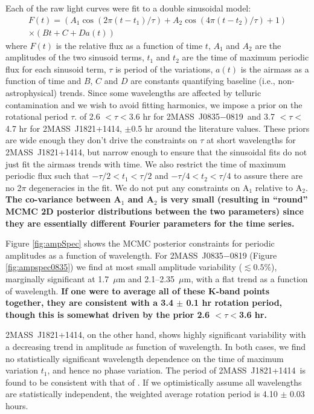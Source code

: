 \documentclass[twocolumn]{aastex6}
\newcommand{\sha}{2MASS~J0835$-$0819}
\newcommand{\shb}{2MASS~J1821+1414}
\begin{document}
Each of the raw light curves were fit to a double sinusoidal model:
\begin{equation}\label{eq:cosfit}
\begin{split}
F(t) = \left( A_1 \cos(2 \pi (t - t_1)/\tau) + A_2 \cos(4 \pi (t - t_2)/\tau) + 1\right) \\
\times (B t + C + D a(t))
\end{split}
\end{equation}
where $F(t)$ is the relative flux as a function of time $t$, $A_1$ and $A_2$ are the amplitudes of the two sinusoid terms, $t_1$ and $t_2$ are the time of maximum periodic flux for each sinusoid term, $\tau$ is period of the variations, $a(t)$ is the airmass as a function of time and $B$, $C$ and $D$ are constants quantifying baseline (i.e., non-astrophysical) trends.
Since some wavelengths are affected by telluric contamination and we wish to avoid fitting harmonics, we impose a prior on the rotational period $\tau$.
of 2.6 $< \tau < $3.6 hr for \sha\ and 3.7 $< \tau <$ 4.7 hr for {\shb}, $\pm$0.5 hr around the literature values.
These priors are wide enough they don't drive the constraints on $\tau$ at short wavelengths for {\shb}, but narrow enough to ensure that the sinusoidal fits do not just fit the airmass trends with time.
We also restrict the time of maximum periodic flux such that $-\tau/2 < t_1 < \tau/2$ and $-\tau/4 < t_2 < \tau/4$ to assure there are no 2$\pi$ degeneracies in the fit.
We do not put any constraints on A$_1$ relative to A$_2$.
\textbf{The co-variance between A$_1$ and A$_2$ is very small (resulting in ``round'' MCMC 2D posterior distributions between the two parameters) since they are essentially different Fourier parameters for the time series.}

Figure \ref{fig:ampSpec} shows the MCMC posterior constraints for periodic amplitudes as a function of wavelength.
For {\sha} (Figure \ref{fig:ampspec0835}) we find at most small amplitude variability ($\lesssim 0.5\%$), marginally significant at 1.7~$\mu$m and 2.1--2.35~$\mu$m, with a flat trend as a function of wavelength.
\textbf{If one were to average all of these K-band points together, they are consistent with a 3.4 $\pm$ 0.1 hr rotation period, though this is somewhat driven by the prior 2.6 $< \tau < $3.6 hr.}

\shb, on the other hand, shows highly significant variability with a decreasing trend in amplitude as function of wavelength.
In both cases, we find no statistically significant wavelength dependence on the time of maximum variation $t_1$, and hence no phase variation.
The period of \shb\ is found to be consistent with that of \citet{2015ApJ...799..154M}.
If we optimistically assume all wavelengths are statistically independent, the weighted average rotation period is 4.10 $\pm$ 0.03 hours.
\end{document}
